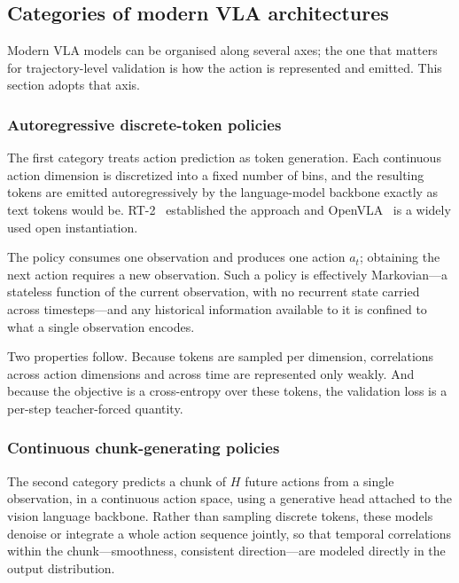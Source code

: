 \documentclass[english,12pt,a4paper,pdftex,elec,utf8]{aaltothesis}
\begin{document}
\subsection{Categories of modern VLA architectures}
\label{sec:vla-categories}

Modern VLA models can be organised along several axes; the one that matters for trajectory-level validation is how the action is represented and emitted. This section adopts that axis.

\subsubsection{Autoregressive discrete-token policies}
\label{subsec:token-policies}

The first category treats action prediction as token generation. Each continuous action dimension is discretized into a fixed number of bins, and the resulting tokens are emitted autoregressively by the language-model backbone exactly as text tokens would be. RT-2~\cite{brohan2023rt2} established the approach and OpenVLA~\cite{kim2024openvla} is a widely used open instantiation.

The policy consumes one observation and produces one action $a_t$; obtaining the next action requires a new observation. Such a policy is effectively Markovian---a stateless function of the current observation, with no recurrent state carried across timesteps---and any historical information available to it is confined to what a single observation encodes.

Two properties follow. Because tokens are sampled per dimension, correlations across action dimensions and across time are represented only weakly. And because the objective is a cross-entropy over these tokens, the validation loss is a per-step teacher-forced quantity. 

\subsubsection{Continuous chunk-generating policies}
\label{subsec:chunk-policies}

The second category predicts a chunk of $H$ future actions from a single observation, in a continuous action space, using a generative head attached to the vision language backbone. Rather than sampling discrete tokens, these models denoise or integrate a whole action sequence jointly, so that temporal
correlations within the chunk---smoothness, consistent direction---are modeled directly in the output distribution.
\end{document}
